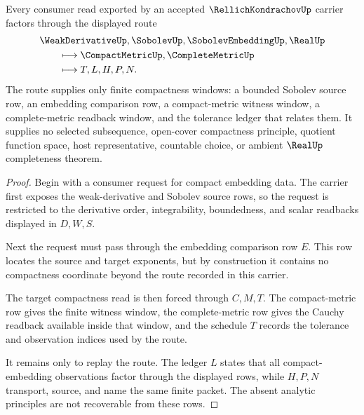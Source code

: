 \begin{theorem}
\label{thm:rellich-kondrachov-finite-compact-embedding-route}
Every consumer read exported by an accepted $\RellichKondrachovUp$ carrier factors through the displayed route
$$
\begin{aligned}
&\WeakDerivativeUp,\SobolevUp,\SobolevEmbeddingUp,\RealUp \\
&\qquad\longmapsto \CompactMetricUp,\CompleteMetricUp \\
&\qquad\longmapsto T,L,H,P,N.
\end{aligned}
$$
The route supplies only finite compactness windows: a bounded Sobolev source row, an embedding comparison row, a compact-metric witness window, a complete-metric readback window, and the tolerance ledger that relates them. It supplies no selected subsequence, open-cover compactness principle, quotient function space, host representative, countable choice, or ambient $\RealUp$ completeness theorem.
\end{theorem}
\begin{proof}
Begin with a consumer request for compact embedding data. The carrier first exposes the weak-derivative and Sobolev source rows, so the request is restricted to the derivative order, integrability, boundedness, and scalar readbacks displayed in $D,W,S$.

Next the request must pass through the embedding comparison row $E$. This row locates the source and target exponents, but by construction it contains no compactness coordinate beyond the route recorded in this carrier.

The target compactness read is then forced through $C,M,T$. The compact-metric row gives the finite witness window, the complete-metric row gives the Cauchy readback available inside that window, and the schedule $T$ records the tolerance and observation indices used by the route.

It remains only to replay the route. The ledger $L$ states that all compact-embedding observations factor through the displayed rows, while $H,P,N$ transport, source, and name the same finite packet. The absent analytic principles are not recoverable from these rows.
\end{proof}


